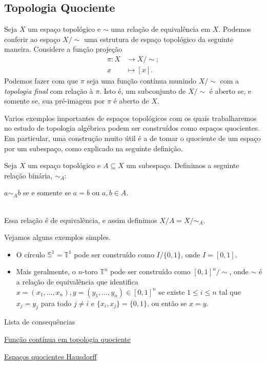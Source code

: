 \subsection{Topologia Quociente}
\label{topologia-quociente-def}
\begin{defi}
	Seja \(X\) um espaço topológico e \(\sim\) uma relação de equivalência em \(X\).
	Podemos conferir ao espaço \(X/\sim\) uma estrutura de espaço topológico da seguinte maneira. Considere a função projeção
	\begin{align*}
		\pi:X&\to X/\sim;\\
		x&\mapsto [x].
	\end{align*}
	Podemos fazer com que \(\pi\) seja uma função contínua munindo \(X/\sim\) com a \emph{topologia final} com relação à \(\pi\). Isto é, um subconjunto de \(X/\sim\) é aberto se, e somente se, sua pré-imagem por $\pi$ é aberto de \(X\).
\end{defi}

Varios exemplos importantes de espaços topológicos com os quais trabalharemos no estudo de topologia algébrica podem ser construídos como espaços quocientes. Em particular, uma construção muito útil é a de tomar o quociente de um espaço por um subespaço, como explicado na seguinte definição.
\begin{defi}
	Seja \(X\) um espaço topológico e \(A \subseteq X\) um subespaço. Definimos a seguinte relação binária, \(\sim_A\):\\
    \centerline{
	\(a\sim_A b\) se e somente se \(a=b\) ou \(a,b\in A\).}\\ Essa relação é de equivalência, e assim definimos \(X/A = X/\sim_A\). 
\end{defi}

Vejamos alguns exemplos simples.

\begin{ex}
    \begin{itemize}
        \item O círculo \(\mathbb{S}^1 = \mathbb{T}^1\) pode ser construído como \(I/\{0,1\}\), onde \(I=[0,1]\).
        \item Mais geralmente, o $n$-toro $\mathbb{T}^n$ pode ser construído como $[0,1]^n/\sim$, onde $\sim$ é a relação de equivalência que identifica $x = (x_1,\ldots,x_n), y = (y_1,\ldots,y_n) \in [0,1]^n$ se existe $1\leq i\leq n$ tal que $x_j = y_j$ para todo $j \neq i$ e $\{x_i,x_j\} = \{0,1\}$, ou então se $x=y$.
    \end{itemize}
\end{ex}

\begin{titlemize}{Lista de consequências}
    \item \hyperref[funcao-continua-em-topologia-quociente-prop]{Função contínua em topologia quociente}
	\item \hyperref[topologia-quociente-hausdorff-thm]{Espaços quocientes Hausdorff}
\end{titlemize}


